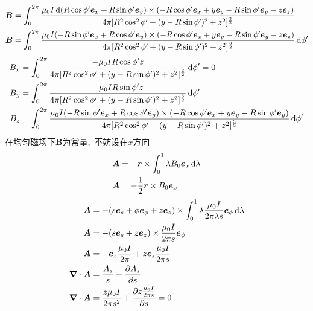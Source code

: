 \begin{align*}
    \boldsymbol{B}&=\int_{0}^{2\pi}\frac{\mu_0 I\dif (R\cos\phi'\boldsymbol{e}_x+ R\sin\phi'\boldsymbol{e}_y)\times(-R\cos\phi'\boldsymbol{e}_x+y\boldsymbol{e}_y -R\sin\phi'\boldsymbol{e}_y-z\boldsymbol{e}_z)}{4\pi [R^2\cos^2\phi'+(y -R\sin\phi')^2+z^2]^\frac32}\\
    \boldsymbol{B}&=\int_{0}^{2\pi}\frac{\mu_0 I (-R\sin\phi'\boldsymbol{e}_x+ R\cos\phi'\boldsymbol{e}_y)\times(-R\cos\phi'\boldsymbol{e}_x+y\boldsymbol{e}_y -R\sin\phi'\boldsymbol{e}_y-z\boldsymbol{e}_z)}{4\pi [R^2\cos^2\phi'+(y -R\sin\phi')^2+z^2]^\frac32}\dif \phi'
\end{align*}
\begin{align*}
    B_x&=\int_{0}^{2\pi}\frac{-\mu_0 I  R\cos\phi'z}{4\pi [R^2\cos^2\phi'+(y -R\sin\phi')^2+z^2]^\frac32}\dif\phi'=0\\
    B_y&=\int_{0}^{2\pi}\frac{-\mu_0 IR\sin\phi' z}{4\pi [R^2\cos^2\phi'+(y -R\sin\phi')^2+z^2]^\frac32}\dif \phi'\\
    B_z&=\int_{0}^{2\pi}\frac{\mu_0 I(-R\sin\phi'\boldsymbol{e}_x+ R\cos\phi'\boldsymbol{e}_y)\times(-R\cos\phi'\boldsymbol{e}_x+y\boldsymbol{e}_y -R\sin\phi'\boldsymbol{e}_y)}{4\pi [R^2\cos^2\phi'+(y -R\sin\phi')^2+z^2]^\frac32}\dif \phi'
\end{align*}
在均匀磁场下$\boldsymbol{B}$为常量, \,不妨设在$x$方向
\begin{align*}
    \boldsymbol{A}&=-\boldsymbol{r}\times\int_0^1\lambda B_0\boldsymbol{e}_x\dif\lambda\\
    \boldsymbol{A}&=-\frac12\boldsymbol{r}\times B_0\boldsymbol{e}_x
\end{align*}
\begin{align*}
    \boldsymbol{A}&=-(s\boldsymbol{e}_s+\phi\boldsymbol{e}_\phi+z\boldsymbol{e}_z)\times\int_0^1\lambda\frac{\mu_0I}{2\pi \lambda s}\boldsymbol{e}_\phi\dif\lambda\\
    \boldsymbol{A}&=-(s\boldsymbol{e}_s+z\boldsymbol{e}_z)\times\frac{\mu_0I}{2\pi  s}\boldsymbol{e}_\phi\\
    \boldsymbol{A}&=-\boldsymbol{e}_z\frac{\mu_0I}{2\pi}+z\boldsymbol{e}_s\frac{\mu_0I}{2\pi  s}\\
    \boldsymbol{\nabla} \cdot\boldsymbol{A}&=\frac{A_s}{s}+\dfrac{\partial A_s}{\partial s}\\
    \boldsymbol{\nabla} \cdot\boldsymbol{A}&=\frac{z\mu_0I}{2\pi  s^2}+\dfrac{\partial z\frac{\mu_0I}{2\pi  s}}{\partial s}=0
\end{align*}
